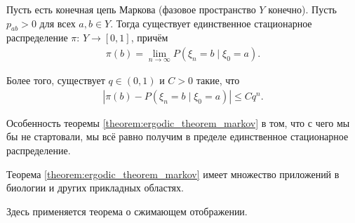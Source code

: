 \documentclass[../main.tex]{subfiles}
\begin{document}
\begin{thm}
 \label{theorem:ergodic_theorem_markov}
 Пусть есть конечная цепь Маркова (фазовое пространство $ Y $ конечно). Пусть $ p_{ab} > 0 $ для всех $ a,b\in Y $. Тогда существует единственное стационарное распределение $ \pi\colon\,Y\to[0,1] $, причём
 \begin{align*}
  \pi(b) = \lim_{n \to \infty} P(\xi_n = b \mid \xi_0 = a).
 \end{align*}

 Более того, существует $ q \in (0,1) $ и $ C> 0 $ такие, что
 \begin{align*}
  \left| \pi(b) - P(\xi_n = b \mid \xi_0 = a) \right| \leqslant C q^{n}.
 \end{align*}
\end{thm}

Особенность теоремы \ref{theorem:ergodic_theorem_markov} в том, что с чего мы бы не стартовали, мы всё равно получим в пределе единственное стационарное распределение.

Теорема \ref{theorem:ergodic_theorem_markov} имеет множество приложений в биологии и других прикладных областях.

Здесь применяется теорема о сжимающем отображении.
\end{document}
